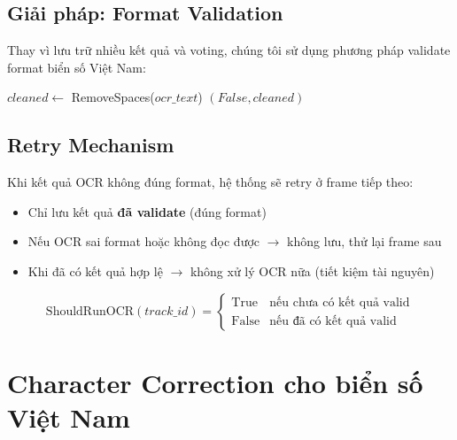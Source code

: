 \subsection{Giải pháp: Format Validation}
Thay vì lưu trữ nhiều kết quả và voting, chúng tôi sử dụng phương pháp validate format biển số Việt Nam:

\begin{algorithm}[!ht]
\SetAlgoLined
{}

$cleaned \leftarrow$ RemoveSpaces($ocr\_text$)\;
\Return $(False, cleaned)$\;
\caption{Thuật toán Validation biển số Việt Nam}
\label{alg:validation}
\end{algorithm}

\subsection{Retry Mechanism}
Khi kết quả OCR không đúng format, hệ thống sẽ retry ở frame tiếp theo:
\begin{itemize}
    \item Chỉ lưu kết quả \textbf{đã validate} (đúng format)
    \item Nếu OCR sai format hoặc không đọc được $\rightarrow$ không lưu, thử lại frame sau
    \item Khi đã có kết quả hợp lệ $\rightarrow$ không xử lý OCR nữa (tiết kiệm tài nguyên)
\end{itemize}

\begin{equation}
    \text{ShouldRunOCR}(track\_id) = \begin{cases}
        \text{True} & \text{nếu chưa có kết quả valid} \\
        \text{False} & \text{nếu đã có kết quả valid}
    \end{cases}
\end{equation}

\section{Character Correction cho biển số Việt Nam}

